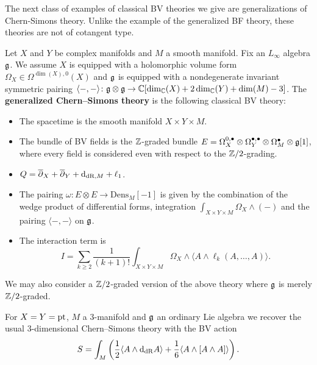 \documentclass[10pt, oneside]{article}
\newcommand{\Dens}{\mathrm{Dens}}
\begin{document}
The next class of examples of classical BV theories we give are generalizations of Chern-Simons theory. Unlike the example of the generalized BF theory, these theories are not of cotangent type.

\begin{definition}
Let $X$ and $Y$ be complex manifolds and $M$ a smooth manifold. Fix an $L_\infty$ algebra $\mathfrak g$. We assume $X$ is equipped with a holomorphic volume form $\Omega_X \in\Omega^{\dim(X), 0}(X)$ and $\mathfrak g$ is equipped with a nondegenerate invariant symmetric pairing $\langle-, -\rangle\colon \mathfrak g\otimes\mathfrak g\rightarrow \mathbb C[\dim_\mathbb C(X) + 2\dim_\mathbb C(Y) + \dim(M) - 3]$. The {\bf generalized Chern--Simons theory} is the following classical BV theory:
\begin{itemize}
\item The spacetime is the smooth manifold $X\times Y\times M$.

\item The bundle of BV fields is the $\mathbb Z$-graded bundle $E = \Omega^{0,\bullet}_X \otimes \Omega^{\bullet,\bullet}_Y \otimes \Omega^\bullet_M \otimes \mathfrak g[1]$, where every field is considered even with respect to the $\mathbb Z/2$-grading.

\item $Q = \overline{\partial}_X + \overline{\partial}_Y + {\rm d}_{\mathrm{dR}, M} + \ell_1$.

\item The pairing $\omega\colon E\otimes E\rightarrow \Dens_M[-1]$ is given by the combination of the wedge product of differential forms, integration $\int_{X\times Y\times M} \Omega_X\wedge (-)$ and the pairing $\langle -, -\rangle$ on $\mathfrak g$.

\item The interaction term is
\[I = \sum_{k\geq 2}\frac{1}{(k+1)!} \int_{X\times Y\times M} \Omega_X\wedge \langle A\wedge \ell_k(A, \dots, A)\rangle.\]
\end{itemize}
\label{def:generalizedBF}
\end{definition}

We may also consider a $\mathbb Z/2$-graded version of the above theory where $\mathfrak g$ is merely $\mathbb Z/2$-graded.

\begin{example}
For $X=Y=\operatorname{pt}$, $M$ a 3-manifold and $\mathfrak g$ an ordinary Lie algebra we recover the usual 3-dimensional Chern--Simons theory with the BV action
\[S = \int_M \left(\frac{1}{2}\langle A\wedge {\rm d}_{\mathrm{dR}} A\rangle + \frac{1}{6}\langle A\wedge [A\wedge A]\rangle\right).\]
\end{example}
\end{document}
